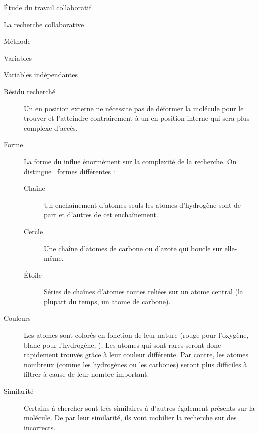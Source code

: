 \documentclass[myfrancais]{mythesis}
\begin{document}
\begin{mypart}{Étude du travail collaboratif}
\begin{mychapter}{La recherche collaborative}
\begin{mysection}{Méthode}
\begin{mysubsection}{Variables}
\begin{mysubsubsection}{Variables indépendantes}
\begin{myparagraph}{ Résidu recherché}
\begin{description}
									Un  en position externe ne nécessite pas de déformer la molécule pour le trouver et l'atteindre contrairement à un  en position interne qui sera plus complexe d'accès.
								\item[Forme] La forme du  influe énormément sur la complexité de la recherche.
									On distingue ~formes différentes :
									\begin{description}
										\item[Chaîne] Un enchaînement d'atomes seuls les atomes d'hydrogène sont de part et d'autres de cet enchaînement.
										\item[Cercle] Une chaîne d'atomes de carbone ou d'azote qui boucle sur elle-même.
										\item[Étoile] Séries de chaînes d'atomes toutes reliées sur un atome central (la plupart du temps, un atome de carbone).
									\end{description}
								\item[Couleurs] Les atomes sont colorés en fonction de leur nature (rouge pour l'oxygène, blanc pour l'hydrogène, \myetc).
									Les atomes qui sont rares seront donc rapidement trouvés grâce à leur couleur différente.
									Par contre, les atomes nombreux (comme les hydrogènes ou les carbones) seront plus difficiles à filtrer à cause de leur nombre important.
								\item[Similarité] Certains  à chercher sont très similaires à d'autres  également présents sur la molécule.
									De par leur similarité, ils vont mobilier la recherche sur des  incorrects.
							\end{description}


\end{myparagraph}
\end{mysubsubsection}
\end{mysubsection}
\end{mysection}
\end{mychapter}
\end{mypart}
\end{document}
